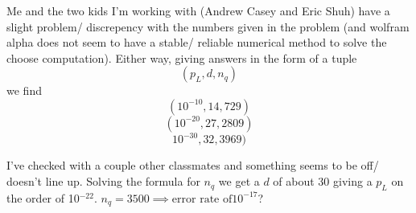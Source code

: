 Me and the two kids I'm working with (Andrew Casey and Eric Shuh) have a slight problem/
discrepency with the numbers given in the problem (and wolfram alpha does not
seem to have a stable/ reliable numerical method to solve the choose
computation). Either way, giving answers in the form of a tuple
$$(p_L,d,n_q)$$
we find
$$(10^{-10},14,729)$$
$$(10^{-20},27,2809)$$
$$10^{-30},32,3969)$$

I've checked with a couple other classmates and something seems to be off/
doesn't line up. Solving the formula for $n_q$ we get a $d$ of about 30 giving a
$p_L$ on the order of 10$^{-22}$. $n_q=3500\implies\text{error rate of
}10^{-17}$?













